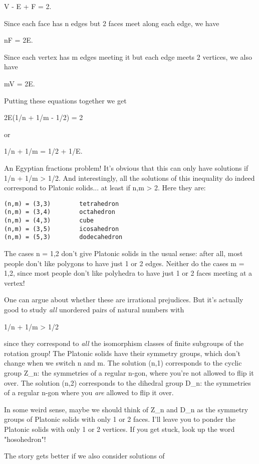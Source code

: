 V - E + F = 2.

Since each face has n edges but 2 faces meet along each edge,
we have

nF = 2E.

Since each vertex has m edges meeting it but each edge
meets 2 vertices, we also have

mV = 2E.

Putting these equations together we get

2E(1/n + 1/m - 1/2) = 2

or

1/n + 1/m = 1/2 + 1/E.

An Egyptian fractions problem!  It's obvious that this can only
have solutions if 1/n + 1/m > 1/2.  And interestingly, all the
solutions of this inequality do indeed correspond to Platonic solids... 
at least if n,m > 2.  Here they are:

\begin{verbatim}
(n,m) = (3,3)        tetrahedron
(n,m) = (3,4)        octahedron
(n,m) = (4,3)        cube
(n,m) = (3,5)        icosahedron
(n,m) = (5,3)        dodecahedron
\end{verbatim}
    

The cases n = 1,2 don't give Platonic solids in the usual sense:
after all, most people don't like polygons to have just 1 or 2 edges. 
Neither do the cases m = 1,2, since most people don't like polyhedra 
to have just 1 or 2 faces meeting at a vertex!  

One can argue about whether these are irrational prejudices.  But it's
actually good to study \emph{all} unordered pairs of natural numbers with

1/n + 1/m > 1/2 


since they correspond to \emph{all} the isomorphism classes of finite
subgroups of the rotation group!  The Platonic solids have their
symmetry groups, which don't change when we switch n and m.  The
solution (n,1) corresponds to the cyclic group Z_{n}: the
symmetries of a regular n-gon, where you're not allowed to flip it over.
The solution (n,2) corresponds to the dihedral group D_{n}: the
symmetries of a regular n-gon where you \emph{are} allowed to flip it
over.


In some weird sense, maybe we should think of Z_{n} and
D_{n} as the symmetry groups of Platonic solids with only 1 or 2
faces.  I'll leave you to ponder the Platonic solids with only 1 or 2
vertices.  If you get stuck, look up the word "hosohedron"!

The story gets better if we also consider solutions of 

